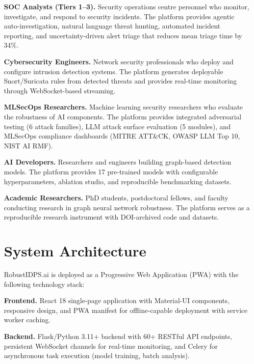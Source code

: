 \noindent\textbf{SOC Analysts (Tiers 1--3).} Security operations centre personnel who monitor, investigate, and respond to security incidents. The platform provides agentic auto-investigation, natural language threat hunting, automated incident reporting, and uncertainty-driven alert triage that reduces mean triage time by 34\%.

\noindent\textbf{Cybersecurity Engineers.} Network security professionals who deploy and configure intrusion detection systems. The platform generates deployable Snort/Suricata rules from detected threats and provides real-time monitoring through WebSocket-based streaming.

\noindent\textbf{MLSecOps Researchers.} Machine learning security researchers who evaluate the robustness of AI components. The platform provides integrated adversarial testing (6 attack families), LLM attack surface evaluation (5 modules), and MLSecOps compliance dashboards (MITRE ATT\&CK, OWASP LLM Top 10, NIST AI RMF).

\noindent\textbf{AI Developers.} Researchers and engineers building graph-based detection models. The platform provides 17 pre-trained models with configurable hyperparameters, ablation studio, and reproducible benchmarking datasets.

\noindent\textbf{Academic Researchers.} PhD students, postdoctoral fellows, and faculty conducting research in graph neural network robustness. The platform serves as a reproducible research instrument with DOI-archived code and datasets.


\section{System Architecture}
\label{sec:system_arch}

RobustIDPS.ai is deployed as a Progressive Web Application (PWA) with the following technology stack:

\noindent\textbf{Frontend.} React 18 single-page application with Material-UI components, responsive design, and PWA manifest for offline-capable deployment with service worker caching.

\noindent\textbf{Backend.} Flask/Python 3.11+ backend with 60+ RESTful API endpoints, persistent WebSocket channels for real-time monitoring, and Celery for asynchronous task execution (model training, batch analysis).

